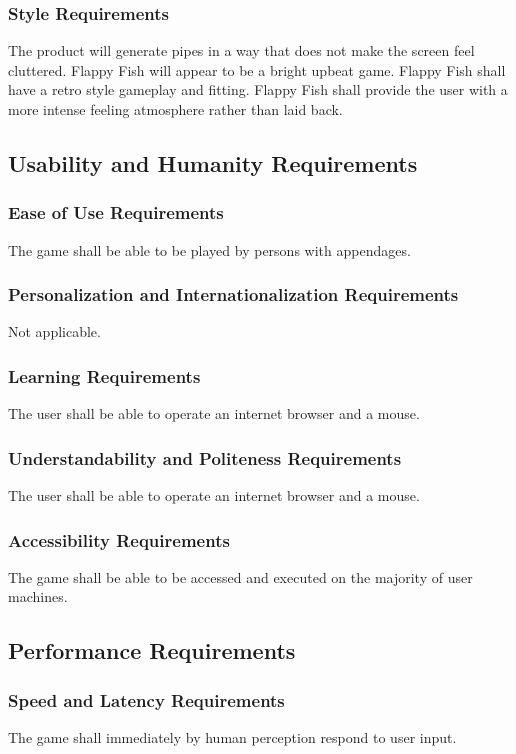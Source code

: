 \documentclass[11pt, oneside]{article}   	%
\begin{document}
\subsubsection*{Style Requirements}
The product will generate pipes in a way that does not make the screen feel cluttered. Flappy Fish will appear to be a bright upbeat game. Flappy Fish shall have a retro style gameplay and fitting. Flappy Fish shall provide the user with a more intense feeling atmosphere rather than laid back. 


\subsection*{Usability and Humanity Requirements}
\subsubsection*{Ease of Use Requirements}
The game shall be able to be played by persons with appendages.


\subsubsection*{Personalization and Internationalization Requirements}
Not applicable.


\subsubsection*{Learning Requirements}
The user shall be able to operate an internet browser and a mouse.


\subsubsection*{Understandability and Politeness Requirements}
The user shall be able to operate an internet browser and a mouse.


\subsubsection*{Accessibility Requirements}
The game shall be able to be accessed and executed on the majority of user machines.


\subsection*{Performance Requirements}
\subsubsection*{Speed and Latency Requirements}
The game shall immediately by human perception respond to user input.
\end{document}
